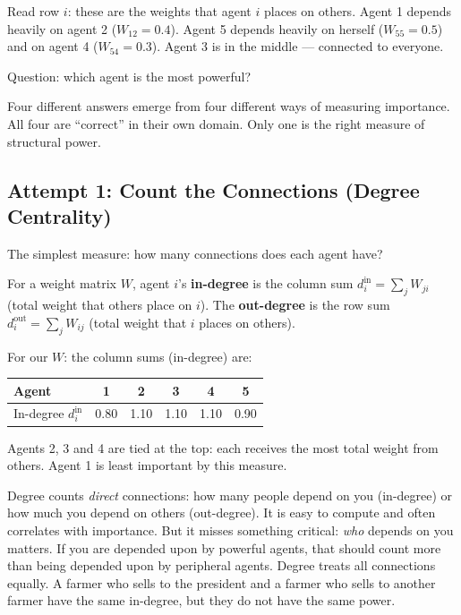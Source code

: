 \documentclass[../structural_economics_book.tex]{subfiles}
\begin{document}
Read row $i$: these are the weights that agent $i$ places on others. Agent 1 depends heavily on agent 2 ($W_{12} = 0.4$). Agent 5 depends heavily on herself ($W_{55} = 0.5$) and on agent 4 ($W_{54} = 0.3$). Agent 3 is in the middle --- connected to everyone.

Question: which agent is the most powerful?

Four different answers emerge from four different ways of measuring importance. All four are ``correct'' in their own domain. Only one is the right measure of structural power.


\subsection{Attempt 1: Count the Connections (Degree Centrality)}

The simplest measure: how many connections does each agent have?

\begin{definition}\label{ch06:def:degree}
For a weight matrix $W$, agent $i$'s \textbf{in-degree} is the column sum $d_i^{\text{in}} = \sum_{j} W_{ji}$ (total weight that others place on $i$). The \textbf{out-degree} is the row sum $d_i^{\text{out}} = \sum_j W_{ij}$ (total weight that $i$ places on others).
\end{definition}

For our $W$: the column sums (in-degree) are:

\begin{center}
\begin{tabular}{lccccc}
\toprule
Agent & 1 & 2 & 3 & 4 & 5 \\
\midrule
In-degree $d^{\text{in}}_i$ & 0.80 & 1.10 & 1.10 & 1.10 & 0.90 \\
\bottomrule
\end{tabular}
\end{center}

Agents 2, 3 and 4 are tied at the top: each receives the most total weight from others. Agent 1 is least important by this measure.

\begin{intuition}
Degree counts \textit{direct} connections: how many people depend on you (in-degree) or how much you depend on others (out-degree). It is easy to compute and often correlates with importance. But it misses something critical: \textit{who} depends on you matters. If you are depended upon by powerful agents, that should count more than being depended upon by peripheral agents. Degree treats all connections equally. A farmer who sells to the president and a farmer who sells to another farmer have the same in-degree, but they do not have the same power.
\end{intuition}
\end{document}
